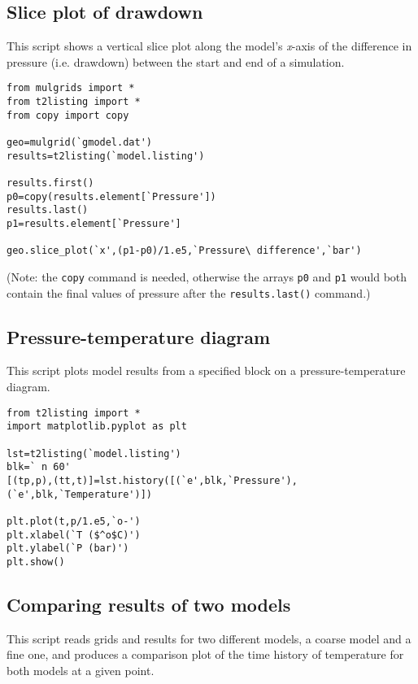 \subsection{Slice plot of drawdown}

This script shows a vertical slice plot along the model's \emph{x}-axis of the difference in pressure (i.e. drawdown) between the start and end of a simulation.

\begin{verbatim}
from mulgrids import *
from t2listing import *
from copy import copy

geo=mulgrid(`gmodel.dat')
results=t2listing(`model.listing')

results.first()
p0=copy(results.element[`Pressure'])
results.last()
p1=results.element[`Pressure']

geo.slice_plot(`x',(p1-p0)/1.e5,`Pressure\ difference',`bar')
\end{verbatim}

(Note: the \texttt{copy} command is needed, otherwise the arrays \texttt{p0} and \texttt{p1} would both contain the final values of pressure after the \texttt{results.last()} command.)

\subsection{Pressure-temperature diagram}

This script plots model results from a specified block on a pressure-temperature diagram.

\begin{verbatim}
from t2listing import *
import matplotlib.pyplot as plt

lst=t2listing(`model.listing')
blk=` n 60'
[(tp,p),(tt,t)]=lst.history([(`e',blk,`Pressure'),(`e',blk,`Temperature')])

plt.plot(t,p/1.e5,`o-')
plt.xlabel(`T ($^o$C)')
plt.ylabel(`P (bar)')
plt.show()
\end{verbatim}

\subsection{Comparing results of two models}
\label{comparison_example}

This script reads grids and results for two different models, a coarse model and a fine one, and produces a comparison plot of the time history of temperature for both models at a given point.

